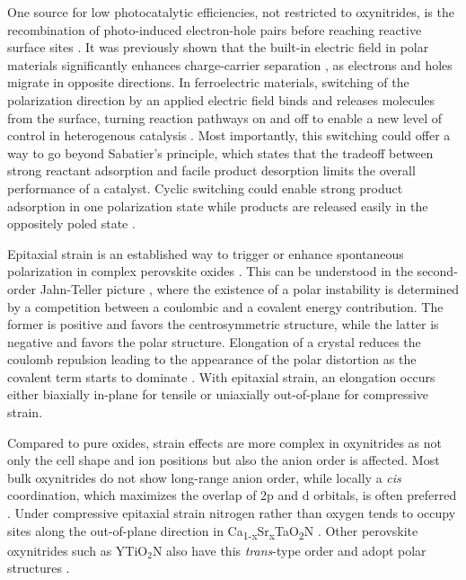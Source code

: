 \documentclass[prl,reprint,aps,twocolumn]{revtex4-1}
\begin{document}
One source for low photocatalytic efficiencies, not restricted to oxynitrides, is the recombination of photo-induced electron-hole pairs before reaching reactive surface sites \cite{yamasita2004recent}.
It was previously shown that the built-in electric field in polar materials significantly enhances charge-carrier separation  \cite{giocondi2001spatial}, as electrons and holes migrate in opposite directions. 
In ferroelectric materials, switching of the polarization direction by an applied electric field binds and releases molecules from the surface, turning reaction pathways on and off to enable a new level of control in heterogenous catalysis \cite{garrity2010chemistry, garrity2013ferroelectric}. 
Most importantly, this switching could offer a way to go beyond Sabatier's principle, which states that the tradeoff between strong reactant adsorption and facile product desorption limits the overall performance of a catalyst. Cyclic switching could enable strong product adsorption in one polarization state while products are released easily in the oppositely poled state \cite{Kakekhani:2015ek}.

Epitaxial strain is an established way to trigger or enhance spontaneous polarization in complex perovskite oxides \cite{haeni2004room, Choi:2004it}. This can be understood in the second-order Jahn-Teller picture \cite{Rondinelli:2009tq, Bersuker:2013fa}, where the existence of a polar instability is determined by a competition between a coulombic and a covalent energy contribution. The former is positive and favors the centrosymmetric structure, while the latter is negative and favors the polar structure. Elongation of a crystal reduces the coulomb repulsion leading to the appearance of the polar distortion as the covalent term starts to dominate \cite{aschauer2014competition}. With epitaxial strain, an elongation occurs either biaxially in-plane for tensile or uniaxially out-of-plane for compressive strain.

Compared to pure oxides, strain effects are more complex in oxynitrides as not only the cell shape and ion positions but also the anion order is affected. Most bulk oxynitrides do not show long-range anion order, while locally a \textit{cis} coordination, which maximizes the overlap 
of 2p and d orbitals, is often preferred \cite{attfield2013principles,yang2011anion, clarke2002oxynitride, fuertes2012chemistry}. Under compressive epitaxial strain nitrogen rather than oxygen tends to occupy sites along the out-of-plane direction in Ca\textsubscript{1-x}Sr\textsubscript{x}TaO\textsubscript{2}N \cite{oka2014possible,oka2017strain}. Other perovskite oxynitrides such as YTiO$_2$N also have this \textit{trans}-type order and adopt polar structures \cite{Caracas:2007el}.
\end{document}
